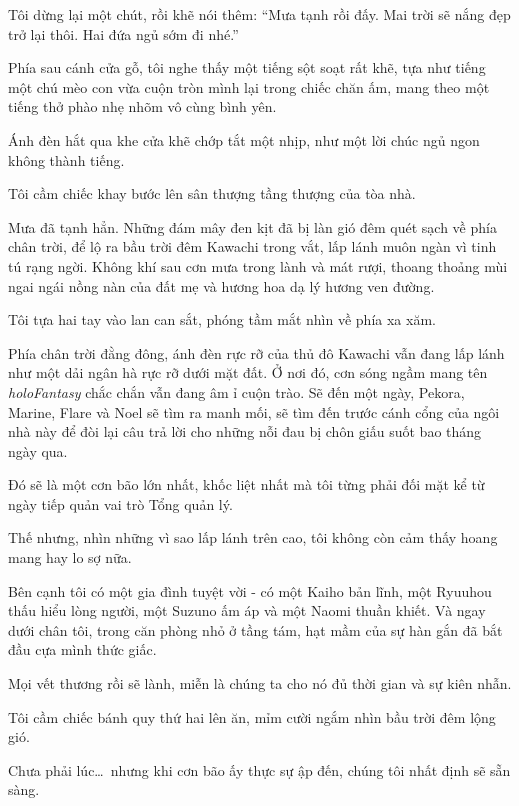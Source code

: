 \documentclass[../main.tex]{subfiles}
\begin{document}
Tôi dừng lại một chút, rồi khẽ nói thêm: ``Mưa tạnh rồi đấy. Mai trời sẽ nắng đẹp trở lại thôi. Hai đứa ngủ sớm đi nhé.''

Phía sau cánh cửa gỗ, tôi nghe thấy một tiếng sột soạt rất khẽ, tựa như tiếng một chú mèo con vừa cuộn tròn mình lại trong chiếc chăn ấm, mang theo một tiếng thở phào nhẹ nhõm vô cùng bình yên.

Ánh đèn hắt qua khe cửa khẽ chớp tắt một nhịp, như một lời chúc ngủ ngon không thành tiếng.

\ct

Tôi cầm chiếc khay bước lên sân thượng tầng thượng của tòa nhà.

Mưa đã tạnh hẳn. Những đám mây đen kịt đã bị làn gió đêm quét sạch về phía chân trời, để lộ ra bầu trời đêm Kawachi trong vắt, lấp lánh muôn ngàn vì tinh tú rạng ngời. Không khí sau cơn mưa trong lành và mát rượi, thoang thoảng mùi ngai ngái nồng nàn của đất mẹ và hương hoa dạ lý hương ven đường.

Tôi tựa hai tay vào lan can sắt, phóng tầm mắt nhìn về phía xa xăm.

Phía chân trời đằng đông, ánh đèn rực rỡ của thủ đô Kawachi vẫn đang lấp lánh như một dải ngân hà rực rỡ dưới mặt đất. Ở nơi đó, cơn sóng ngầm mang tên \textit{holoFantasy} chắc chắn vẫn đang âm ỉ cuộn trào. Sẽ đến một ngày, Pekora, Marine, Flare và Noel sẽ tìm ra manh mối, sẽ tìm đến trước cánh cổng của ngôi nhà này để đòi lại câu trả lời cho những nỗi đau bị chôn giấu suốt bao tháng ngày qua.

Đó sẽ là một cơn bão lớn nhất, khốc liệt nhất mà tôi từng phải đối mặt kể từ ngày tiếp quản vai trò Tổng quản lý.

Thế nhưng, nhìn những vì sao lấp lánh trên cao, tôi không còn cảm thấy hoang mang hay lo sợ nữa.

Bên cạnh tôi có một gia đình tuyệt vời - có một Kaiho bản lĩnh, một Ryuuhou thấu hiểu lòng người, một Suzuno ấm áp và một Naomi thuần khiết. Và ngay dưới chân tôi, trong căn phòng nhỏ ở tầng tám, hạt mầm của sự hàn gắn đã bắt đầu cựa mình thức giấc.

Mọi vết thương rồi sẽ lành, miễn là chúng ta cho nó đủ thời gian và sự kiên nhẫn.

Tôi cầm chiếc bánh quy thứ hai lên ăn, mỉm cười ngắm nhìn bầu trời đêm lộng gió.

Chưa phải lúc\dots\ nhưng khi cơn bão ấy thực sự ập đến, chúng tôi nhất định sẽ sẵn sàng.
\end{document}
